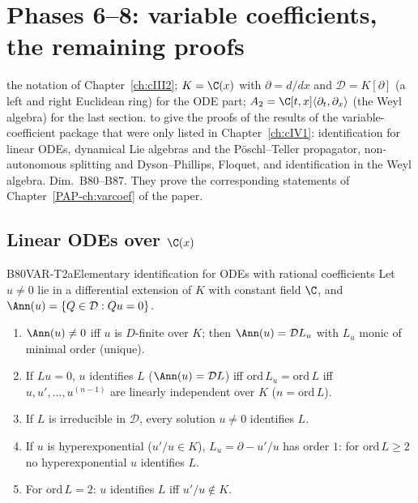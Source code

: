 \chapter[Variable coefficients: more proofs]{Phases 6--8: variable coefficients, the remaining proofs}\label{ch:cIV5}
\chapterbrief
{the notation of Chapter~\ref{ch:cIII2}; $K=\C(x)$ with $\partial=d/dx$ and $\mathcal D=K[\partial]$ (a left and right Euclidean ring) for the ODE part; $A_2=\C[t,x]\langle\partial_t,\partial_x\rangle$ (the Weyl algebra) for the last section.}
{to give the proofs of the results of the variable-coefficient package that were only listed in Chapter~\ref{ch:cIV1}: identification for linear ODEs, dynamical Lie algebras and the P\"oschl--Teller propagator, non-autonomous splitting and Dyson--Phillips, Floquet, and identification in the Weyl algebra.}
{Dim.~B80--B87. They prove the corresponding statements of Chapter~\ref{PAP-ch:varcoef} of the paper.}

\section{Linear ODEs over $\C(x)$}

\begin{dimcard}{B80}{VAR-T2a}{Elementary identification for ODEs with rational coefficients}{\proved}{}
Let $u\ne0$ lie in a differential extension of $K$ with constant field $\C$, and $\Ann(u)=\{Q\in\mathcal D:Qu=0\}$.
\begin{enumerate}[label=(\roman*)]
\item $\Ann(u)\ne0$ iff $u$ is $D$-finite over $K$; then $\Ann(u)=\mathcal DL_u$ with $L_u$ monic of minimal order (unique).
\item If $Lu=0$, $u$ identifies $L$ ($\Ann(u)=\mathcal DL$) iff $\mathrm{ord}\,L_u=\mathrm{ord}\,L$ iff $u,u',\dots,u^{(n-1)}$ are linearly independent over $K$ ($n=\mathrm{ord}\,L$).
\item If $L$ is irreducible in $\mathcal D$, every solution $u\ne0$ identifies $L$.
\item If $u$ is hyperexponential ($u'/u\in K$), $L_u=\partial-u'/u$ has order $1$: for $\mathrm{ord}\,L\ge2$ no hyperexponential $u$ identifies $L$.
\item For $\mathrm{ord}\,L=2$: $u$ identifies $L$ iff $u'/u\notin K$.
\end{enumerate}
\end{dimcard}

